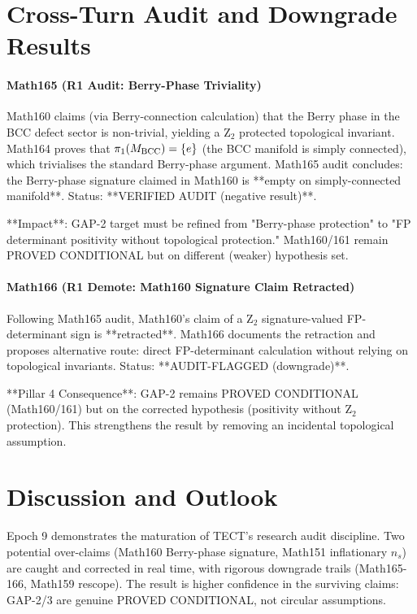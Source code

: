 \section{Cross-Turn Audit and Downgrade Results}
\paragraph{Math165 (R1 Audit: Berry-Phase Triviality)}
Math160 claims (via Berry-connection calculation) that the Berry phase in the
BCC defect sector is non-trivial, yielding a Z$_2$ protected topological
invariant. Math164 proves that $\pi_1(M_{\rm BCC}) = \{e\}$ (the BCC manifold is
simply connected), which trivialises the standard Berry-phase argument. Math165
audit concludes: the Berry-phase signature claimed in Math160 is **empty on
simply-connected manifold**. Status: **VERIFIED AUDIT (negative result)**.

**Impact**: GAP-2 target must be refined from "Berry-phase protection" to "FP
determinant positivity without topological protection." Math160/161 remain
PROVED CONDITIONAL but on different (weaker) hypothesis set.

\paragraph{Math166 (R1 Demote: Math160 Signature Claim Retracted)}
Following Math165 audit, Math160's claim of a Z$_2$ signature-valued FP-determinant
sign is **retracted**. Math166 documents the retraction and proposes alternative
route: direct FP-determinant calculation without relying on topological
invariants. Status: **AUDIT-FLAGGED (downgrade)**.

**Pillar 4 Consequence**: GAP-2 remains PROVED CONDITIONAL (Math160/161) but on
the corrected hypothesis (positivity without Z$_2$ protection). This strengthens
the result by removing an incidental topological assumption.

\section{Discussion and Outlook}
Epoch 9 demonstrates the maturation of TECT's research audit discipline.
Two potential over-claims (Math160 Berry-phase signature, Math151 inflationary
$n_s$) are caught and corrected in real time, with rigorous downgrade trails
(Math165-166, Math159 rescope). The result is higher confidence in the surviving
claims: GAP-2/3 are genuine PROVED CONDITIONAL, not circular assumptions.

